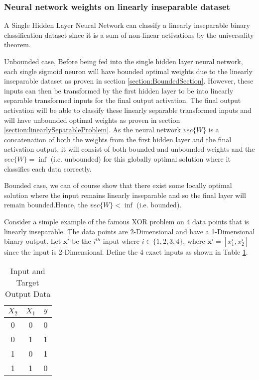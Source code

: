 \documentclass[a4paper,12pt]{article}
\begin{document}
\subsubsection{Neural network weights on linearly inseparable dataset}

A Single Hidden Layer Neural Network can classify a linearly inseparable binary classification dataset
since it is a sum of non-linear activations by the universality theorem.

Unbounded case,
Before being fed into the single hidden layer neural network, each single sigmoid neuron will have bounded optimal weights due to the linearly inseparable dataset as proven in section \ref{section:BoundedSection}. However, these inputs can then be transformed by the first hidden layer to be into linearly separable transformed inputs for the final output activation. The final output activation will be able to classify these linearly separable transformed inputs and will have unbounded optimal weights as proven in section \ref{section:linearlySeparableProblem}. As the neural network $vec\{W\}$ is a concatenation of both the weights from the first hidden layer and the final activation output, it will consist of both bounded and unbounded weights and the $vec\{W\} = \inf$ (i.e. unbounded) for this globally optimal solution where it classifies each data correctly. 

Bounded case, 
we can of course show that there exist some locally optimal solution where the input remains linearly inseparable and so the final layer will remain bounded.Hence, the $vec\{W\} < \inf$ (i.e. bounded). 

Consider a simple example of the famous XOR problem on 4 data points that is linearly inseparable. 
The data points are 2-Dimensional and have a 1-Dimensional binary output. 
Let $\mathbf{x}^{i}$ be the $i^{th}$ input where $i \in \{1, 2, 3, 4\}$, where
$\mathbf{x}^{i} = [x_{1}^{i}, x_{2}^{i}]$ since the input is 2-Dimensional. 
Define the 4 exact inputs as shown in Table \ref{table:TruthTable}.

\begin{table}[ht]
\centering %
\caption{Input and Target Output Data} %
\label{table:TruthTable} %
\begin{tabular}{c c c} %
\hline %
$X_{2}$ & $X_{1}$ & $y$ \\ [0.5ex] 
\hline
0 & 0 & 0 \\
0 & 1 & 1 \\
1 & 0 & 1 \\
1 & 1 & 0 \\ [1ex] %
\hline %
\end{tabular}
\end{table}
\end{document}

